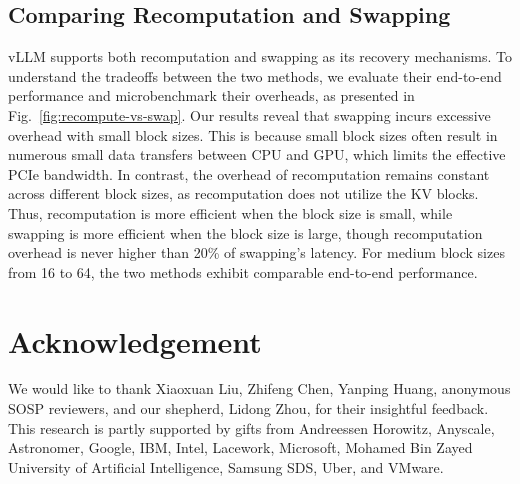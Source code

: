 \documentclass[sigplan,10pt]{acmart}
\newcommand{\sys}[0]{vLLM\xspace}
\begin{document}
\subsection{Comparing Recomputation and Swapping}
\label{sec:eval:scheduling}

\sys supports both recomputation and swapping as its recovery mechanisms.
To understand the tradeoffs between the two methods, we evaluate their end-to-end performance and microbenchmark their overheads, as presented in Fig.~\ref{fig:recompute-vs-swap}.
Our results reveal that swapping incurs excessive overhead with small block sizes.
This is because small block sizes often result in numerous small data transfers between CPU and GPU, which limits the effective PCIe bandwidth.
In contrast, the overhead of recomputation remains constant across different block sizes, as recomputation does not utilize the KV blocks.
Thus, recomputation is more efficient when the block size is small, while swapping is more efficient when the block size is large, though recomputation overhead is never higher than 20\% of swapping's latency.
For medium block sizes from 16 to 64, the two methods exhibit comparable end-to-end performance.





\section*{Acknowledgement}
We would like to thank Xiaoxuan Liu, Zhifeng Chen, Yanping Huang, anonymous SOSP reviewers, and our shepherd, Lidong Zhou, for their insightful feedback.
This research is partly supported by gifts from Andreessen Horowitz, Anyscale, Astronomer, Google, IBM, Intel, Lacework, Microsoft, Mohamed Bin Zayed University of Artificial Intelligence, Samsung SDS, Uber, and VMware.



\end{document}
